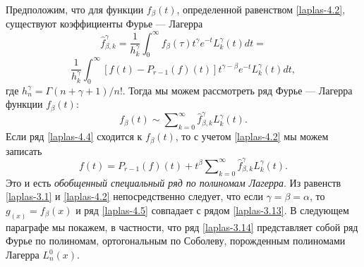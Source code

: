 Предположим, что для функции $f_\beta(t)$, определенной равенством \eqref{laplas-4.2}, существуют коэффициенты Фурье --- Лагерра
\begin{equation*}
  \hat{f}_{\beta,k}^\gamma=\frac1{h_k^\gamma}\int_0^\infty f_\beta(\tau)t^\gamma e^{-t}L_k^\gamma(t)dt=
\end{equation*}
\begin{equation}\label{laplas-4.3}
  \frac1{h_k^\gamma}\int_0^\infty [f(t)-P_{r-1}(f)(t)]t^{\gamma-\beta}e^{-t}L_k^\gamma(t)dt,
\end{equation}
где $h_n^\gamma=\Gamma(n+\gamma+1)/n!$.
Тогда мы можем рассмотреть ряд Фурье --- Лагерра функции $f_\beta(t)$:
\begin{equation}\label{laplas-4.4}
  f_\beta(t)\sim\sum\nolimits_{k=0}^\infty\hat{f}_{\beta,k}^\gamma L_k^\gamma(t).
\end{equation}
Если ряд \eqref{laplas-4.4} сходится к $f_\beta(t)$, то с учетом \eqref{laplas-4.2} мы можем записать
\begin{equation}\label{laplas-4.5}
  f(t)=P_{r-1}(f)(t)+t^\beta\sum\nolimits_{k=0}^\infty\hat{f}_{\beta,k}^\gamma L_k^\gamma(t).
\end{equation}
 Это и есть \textit{ обобщенный специальный ряд по полиномам Лагерра}. Из равенств \eqref{laplas-3.1} и \eqref{laplas-4.2}  непосредственно следует, что  если $\gamma=\beta=\alpha$, то $g_(x)=f_\beta(x)$ и ряд \eqref{laplas-4.5} совпадает с рядом \eqref{laplas-3.13}. В следующем параграфе мы покажем, в частности, что ряд \eqref{laplas-3.14} представляет собой ряд Фурье по полиномам, ортогональным по Соболеву, порожденным полиномами Лагерра $L_n^0(x)$.








